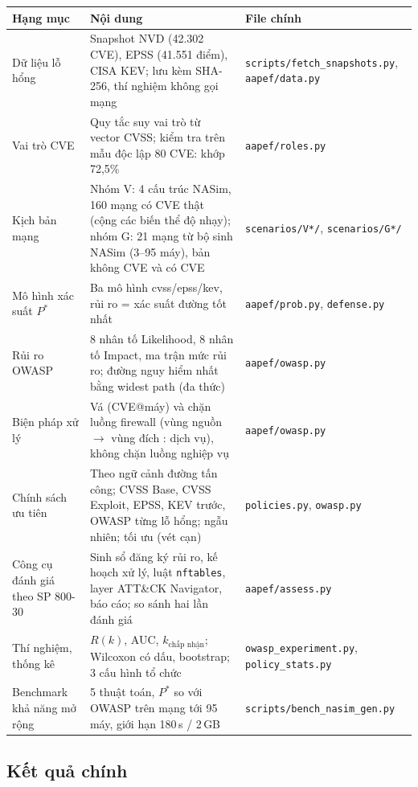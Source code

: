 \documentclass[11pt,a4paper]{article}
\begin{document}
\begin{center}
\small
\begin{tabular}{@{}Y{4.2cm}Y{8.2cm}Y{3.6cm}@{}}
\toprule
\textbf{Hạng mục} & \textbf{Nội dung} & \textbf{File chính} \\
\midrule
Dữ liệu lỗ hổng & Snapshot NVD (42.302 CVE), EPSS (41.551 điểm), CISA KEV; lưu kèm SHA-256, thí nghiệm không gọi mạng & \texttt{scripts/fetch\_snapshots.py}, \texttt{aapef/data.py} \\
Vai trò CVE & Quy tắc suy vai trò từ vector CVSS; kiểm tra trên mẫu độc lập 80 CVE: khớp 72,5\% & \texttt{aapef/roles.py} \\
Kịch bản mạng & Nhóm V: 4 cấu trúc NASim, 160 mạng có CVE thật (cộng các biến thể độ nhạy); nhóm G: 21 mạng từ bộ sinh NASim (3--95 máy), bản không CVE và có CVE & \texttt{scenarios/V*/}, \texttt{scenarios/G*/} \\
Mô hình xác suất $P^{*}$ & Ba mô hình cvss/epss/kev, rủi ro = xác suất đường tốt nhất & \texttt{aapef/prob.py}, \texttt{defense.py} \\
Rủi ro OWASP & 8 nhân tố Likelihood, 8 nhân tố Impact, ma trận mức rủi ro; đường nguy hiểm nhất bằng widest path (đa thức) & \texttt{aapef/owasp.py} \\
Biện pháp xử lý & Vá (CVE@máy) và chặn luồng firewall (vùng nguồn $\to$ vùng đích : dịch vụ), không chặn luồng nghiệp vụ & \texttt{aapef/owasp.py} \\
Chính sách ưu tiên & Theo ngữ cảnh đường tấn công; CVSS Base, CVSS Exploit, EPSS, KEV trước, OWASP từng lỗ hổng; ngẫu nhiên; tối ưu (vét cạn) & \texttt{policies.py}, \texttt{owasp.py} \\
Công cụ đánh giá theo SP 800-30 & Sinh sổ đăng ký rủi ro, kế hoạch xử lý, luật \texttt{nftables}, layer ATT\&CK Navigator, báo cáo; so sánh hai lần đánh giá & \texttt{aapef/assess.py} \\
Thí nghiệm, thống kê & $R(k)$, AUC, $k_{\text{chấp nhận}}$; Wilcoxon có dấu, bootstrap; 3 cấu hình tổ chức & \texttt{owasp\_experiment.py}, \texttt{policy\_stats.py} \\
Benchmark khả năng mở rộng & 5 thuật toán, $P^{*}$ so với OWASP trên mạng tới 95 máy, giới hạn 180\,s / 2\,GB & \texttt{scripts/bench\_nasim\_gen.py} \\
\bottomrule
\end{tabular}
\end{center}

\subsection{Kết quả chính}
\end{document}
